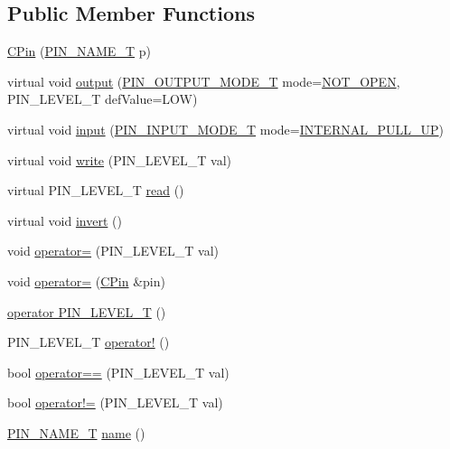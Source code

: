\subsection*{Public Member Functions}
\begin{DoxyCompactItemize}
\item 
\hyperlink{class_c_pin_a7338f2960b4d8992c43f3c6067742ded}{C\-Pin} (\hyperlink{group___peripheral_ga65a2241721e4acb573e0c3fe29ac432f}{P\-I\-N\-\_\-\-N\-A\-M\-E\-\_\-\-T} p)
\item 
virtual void \hyperlink{class_c_pin_a84cd9c4613a9b53f00e52c23b4eed050}{output} (\hyperlink{group___peripheral_ga29412fef1d1b9fafc0cd270a5d702f28}{P\-I\-N\-\_\-\-O\-U\-T\-P\-U\-T\-\_\-\-M\-O\-D\-E\-\_\-\-T} mode=\hyperlink{group___peripheral_gga62483064e24f6949ab0a9b9234b4e549afd68b1a66f2a33ce77d4f6c7f8fc998a}{N\-O\-T\-\_\-\-O\-P\-E\-N}, P\-I\-N\-\_\-\-L\-E\-V\-E\-L\-\_\-\-T def\-Value=L\-O\-W)
\item 
virtual void \hyperlink{class_c_pin_a21aa5b473c1a3637a487c7724f8b9fcf}{input} (\hyperlink{group___peripheral_gad5705547b72a4480dc714447b3bbfb64}{P\-I\-N\-\_\-\-I\-N\-P\-U\-T\-\_\-\-M\-O\-D\-E\-\_\-\-T} mode=\hyperlink{group___peripheral_gga16ce6180d8bb2eb23a7df8f8923ea581a781a7f23ae9b0dbdc6edfdcfd3be75df}{I\-N\-T\-E\-R\-N\-A\-L\-\_\-\-P\-U\-L\-L\-\_\-\-U\-P})
\item 
virtual void \hyperlink{class_c_pin_a1fc3486f4afea4de56ae677c20600551}{write} (P\-I\-N\-\_\-\-L\-E\-V\-E\-L\-\_\-\-T val)
\item 
virtual P\-I\-N\-\_\-\-L\-E\-V\-E\-L\-\_\-\-T \hyperlink{class_c_pin_a02060b0c9bbf0f75dead7bef1c75ce6b}{read} ()
\item 
virtual void \hyperlink{class_c_pin_a240de24c726724aeda90bfacf1d50cc5}{invert} ()
\item 
void \hyperlink{class_c_pin_a7d125bef83689d0f1db13b3f1acbd05e}{operator=} (P\-I\-N\-\_\-\-L\-E\-V\-E\-L\-\_\-\-T val)
\item 
void \hyperlink{class_c_pin_a01428eca1b98e2e194bd0848b3eb8904}{operator=} (\hyperlink{class_c_pin}{C\-Pin} \&pin)
\item 
\hyperlink{class_c_pin_a9037649d1e88192f5fde46b810c71299}{operator P\-I\-N\-\_\-\-L\-E\-V\-E\-L\-\_\-\-T} ()
\item 
P\-I\-N\-\_\-\-L\-E\-V\-E\-L\-\_\-\-T \hyperlink{class_c_pin_a5ec08fca85a5f9472e82588a6a895b8f}{operator!} ()
\item 
bool \hyperlink{class_c_pin_ae9f57493334eeb6e69a77a0cf4e50f95}{operator==} (P\-I\-N\-\_\-\-L\-E\-V\-E\-L\-\_\-\-T val)
\item 
bool \hyperlink{class_c_pin_aae98a7d34d72ccc58b6d799f7ad2e12e}{operator!=} (P\-I\-N\-\_\-\-L\-E\-V\-E\-L\-\_\-\-T val)
\item 
\hyperlink{group___peripheral_ga65a2241721e4acb573e0c3fe29ac432f}{P\-I\-N\-\_\-\-N\-A\-M\-E\-\_\-\-T} \hyperlink{class_c_pin_a5e6cdf81b6a8869e3c1e78dffb6ddca5}{name} ()
\end{DoxyCompactItemize}


